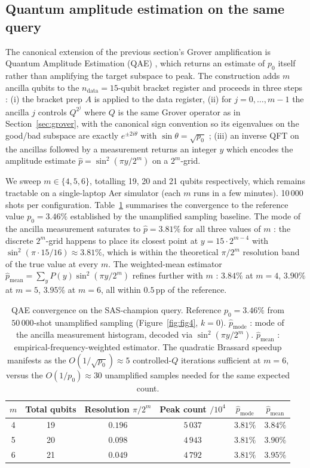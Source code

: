 \documentclass[11pt]{article}
\begin{document}
\subsection{Quantum amplitude estimation on the same query}
\label{sec:qae}

The canonical extension of the previous section's Grover amplification
is Quantum Amplitude Estimation (QAE) \cite{brassard2002quantum}, which
returns an estimate of $p_0$ itself rather than amplifying the target
subspace to peak. The construction adds $m$ ancilla qubits to the
$n_{\text{data}} = 15$-qubit bracket register and proceeds in three
steps : (i) the bracket prep $A$ is applied to the data register,
(ii) for $j = 0, \dots, m - 1$ the ancilla $j$ controls $Q^{2^j}$
where $Q$ is the same Grover operator as in
Section~\ref{sec:grover}, with the canonical sign convention so its
eigenvalues on the good/bad subspace are exactly $e^{\pm 2i\theta}$
with $\sin\theta = \sqrt{p_0}$ ; (iii) an inverse QFT on the ancillas
followed by a measurement returns an integer $y$ which encodes the
amplitude estimate $\hat p = \sin^2(\pi y / 2^m)$ on a $2^m$-grid.

We sweep $m \in \{4, 5, 6\}$, totalling 19, 20 and 21 qubits
respectively, which remains tractable on a single-laptop Aer
simulator (each $m$ runs in a few minutes). 10\,000 shots per
configuration. Table~\ref{tab:qae} summarises the convergence to
the reference value $p_0 = 3.46\%$ established by the unamplified
sampling baseline. The mode of the ancilla measurement saturates
to $\hat p = 3.81\%$ for all three values of $m$ : the discrete
$2^m$-grid happens to place its closest point at $y = 15 \cdot
2^{m-4}$ with $\sin^2(\pi \cdot 15/16) \approx 3.81\%$, which is
within the theoretical $\pi / 2^m$ resolution band of the true
value at every $m$. The weighted-mean estimator $\hat p_{\text{mean}}
= \sum_y P(y) \sin^2(\pi y / 2^m)$ refines further with $m$ : $3.84\%$
at $m = 4$, $3.90\%$ at $m = 5$, $3.95\%$ at $m = 6$, all within
$0.5$\,pp of the reference.

\begin{table}[!htbp]
\centering
\caption{QAE convergence on the SAS-champion query. Reference
$p_0 = 3.46\%$ from $50\,000$-shot unamplified sampling
(Figure~\ref{fig:fig4}, $k = 0$). $\hat p_{\text{mode}}$ : mode of
the ancilla measurement histogram, decoded via $\sin^2(\pi y / 2^m)$.
$\hat p_{\text{mean}}$ : empirical-frequency-weighted estimator. The
quadratic Brassard speedup manifests as the
$O(1/\sqrt{p_0}) \approx 5$ controlled-$Q$ iterations sufficient at
$m = 6$, versus the $O(1/p_0) \approx 30$ unamplified samples needed
for the same expected count.}
\label{tab:qae}
\small
\begin{tabular}{cccccc}
\toprule
$m$ & Total qubits & Resolution $\pi / 2^m$ & Peak count $/ 10^4$ &
$\hat p_{\text{mode}}$ & $\hat p_{\text{mean}}$ \\
\midrule
4 & 19 & $0.196$ & $5\,037$ & $3.81\%$ & $3.84\%$ \\
5 & 20 & $0.098$ & $4\,943$ & $3.81\%$ & $3.90\%$ \\
6 & 21 & $0.049$ & $4\,792$ & $3.81\%$ & $3.95\%$ \\
\bottomrule
\end{tabular}
\end{table}
\end{document}
